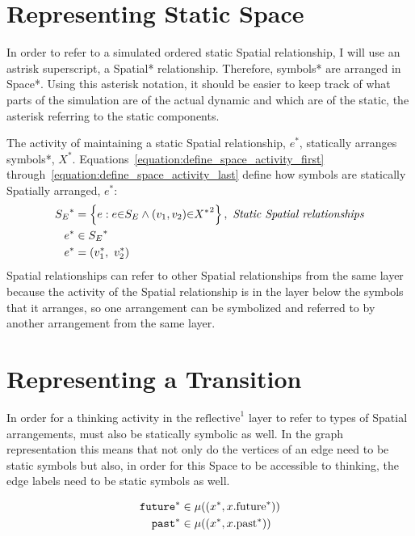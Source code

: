 \section{Representing Static Space}

In order to refer to a simulated ordered static Spatial relationship,
I will use an astrisk superscript, a Spatial* relationship.
Therefore, symbols* are arranged in Space*.  Using this asterisk
notation, it should be easier to keep track of what parts of the
simulation are of the actual dynamic and which are of the static, the
asterisk referring to the static components.

The activity of maintaining a static Spatial relationship, $e^*$,
statically arranges symbols*, $X^*$.
Equations~\ref{equation:define_space_activity_first}
through~\ref{equation:define_space_activity_last} define how symbols
are statically Spatially arranged, $e^*$:
\begin{align}
\label{equation:define_space_activity_first}
        {S_E}^* &= \left\{e : e{\in}S_E \wedge (v_1, v_2) {\in} {X^*}^2\right\}, ~\text{\emph{Static Spatial relationships}} \\
      e^* &\in {S_E}^* \\
\label{equation:define_space_activity_last}
      e^* &= (v_1^*, ~v_2^*)
\end{align}
Spatial relationships can refer to other Spatial relationships from
the same layer because the activity of the Spatial relationship is in
the layer below the symbols that it arranges, so one arrangement can
be symbolized and referred to by another arrangement from the same
layer.

\section{Representing a Transition}

In order for a thinking activity in the $\text{reflective}^1$ layer to
refer to types of Spatial arrangements, must also be statically
symbolic as well.  In the graph representation this means that not
only do the vertices of an edge need to be static symbols but also, in
order for this Space to be accessible to thinking, the edge labels
need to be static symbols as well.

\begin{align}
\text{\tt{future}}^* &\in \mu((x^*, x.\text{future}^*)) \\
  \text{\tt{past}}^* &\in \mu((x^*, x.\text{past}^*)) 
\end{align}



